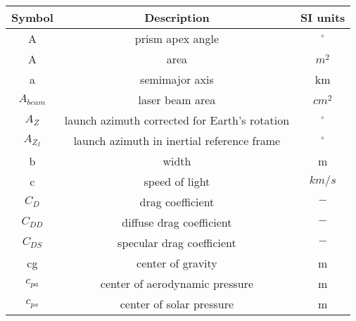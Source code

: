 \begin{center}
\begin{longtable}{c|c|c}

\textbf{Symbol} & \textbf{Description} & \textbf{SI units} \\\hline\hline
A																		& prism apex angle																												& $^\circ$ \\

A																		& area 																																		& $m^2$ \\

a																		& semimajor axis 																													& km \\

$A_{beam}$                    	    & laser beam area                               													& $cm^2$ \\

$A_Z$																& launch azimuth corrected for Earth's rotation  													& $^\circ$ \\

$A_{Z_I}$                           & launch azimuth in inertial reference frame  														& $^\circ$ \\

b                                  	& width                                       														& m \\

c                                   & speed of light                           																& $km/s$ \\

$C_D$																& drag coefficient 																												& $-$ \\

$C_{DD}$													  & diffuse drag coefficient																								& $-$ \\

$C_{DS}$						       					& specular drag coefficient 																							& $-$ \\

cg                                  & center of gravity                         															& m \\

$c_{pa}$                            & center of aerodynamic pressure            															& m \\

$c_{ps}$                            & center of solar pressure                   															& m \\


\end{longtable}
\end{center}
